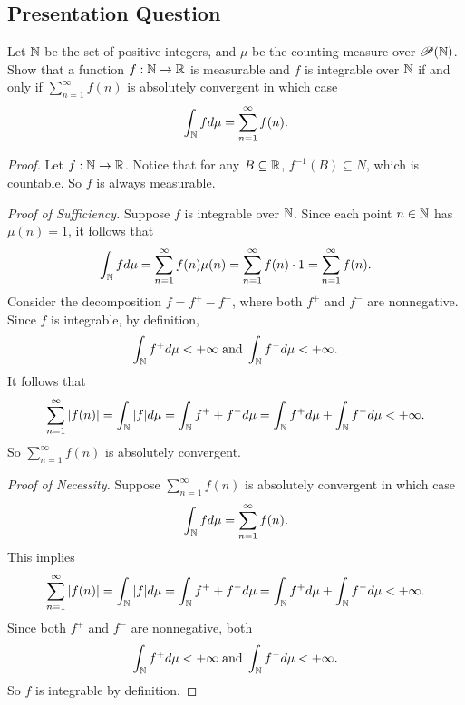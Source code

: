\documentclass[class=book, crop=false]{standalone}
\begin{document}
        \subsection{Presentation Question}
        \begin{question}
            Let $\mathbb{N}$ be the set of positive integers, and $\mu$ be the counting measure over $\mathscr{P}(\mathbb{N})$. Show that a function $f : \mathbb{N} \rightarrow \mathbb{R}$ is measurable and $f$ is integrable over $\mathbb{N}$ if and only if $\sum^{\infty}_{n = 1} f(n)$ is absolutely convergent in which case
            \begin{equation*}
                \int_{\mathbb{N}} f d\mu = \sum^{\infty}_{n = 1} f(n).
            \end{equation*}
        \end{question}
        \begin{proof}
            Let $f : \mathbb{N} \rightarrow \mathbb{R}$. Notice that for any $B \subseteq \mathbb{R}$, $f^{-1}(B) \subseteq N$, which is countable. So $f$ is always measurable.
            
            \noindent \textit{Proof of Sufficiency.} Suppose $f$ is integrable over $\mathbb{N}$. Since each point $n \in \mathbb{N}$ has $\mu(n) = 1$, it follows that
            \begin{equation*}
                \int_{\mathbb{N}} f d\mu = \sum^{\infty}_{n = 1} f(n) \mu(n) = \sum^{\infty}_{n = 1} f(n) \cdot 1 = \sum^{\infty}_{n = 1} f(n).
            \end{equation*}
            Consider the decomposition $f = f^+ - f^-$, where both $f^+$ and $f^-$ are nonnegative. Since $f$ is integrable, by definition,
            \begin{equation*}
                \int_{\mathbb{N}} f^+ d\mu < +\infty \;\text{and}\; \int_{\mathbb{N}} f^- d\mu < +\infty.
            \end{equation*}
            It follows that
            \begin{equation*}
                \sum^{\infty}_{n = 1} |f(n)| = \int_{\mathbb{N}} |f| d\mu = \int_{\mathbb{N}} f^+ + f^- d\mu = \int_{\mathbb{N}} f^+ d\mu + \int_{\mathbb{N}} f^- d\mu < +\infty.
            \end{equation*}
            So $\sum^{\infty}_{n = 1} f(n)$ is absolutely convergent.

            \noindent \textit{Proof of Necessity.} Suppose $\sum^{\infty}_{n = 1} f(n)$ is absolutely convergent in which case
            \begin{equation*}
                \int_{\mathbb{N}} f d\mu = \sum^{\infty}_{n = 1} f(n).
            \end{equation*}
            This implies
            \begin{equation*}
                \sum^{\infty}_{n = 1} |f(n)| = \int_{\mathbb{N}} |f| d\mu = \int_{\mathbb{N}} f^+ + f^- d\mu = \int_{\mathbb{N}} f^+ d\mu + \int_{\mathbb{N}} f^- d\mu < +\infty.
            \end{equation*}
            Since both $f^+$ and $f^-$ are nonnegative, both
            \begin{equation*}
                \int_{\mathbb{N}} f^+ d\mu < +\infty \;\text{and}\; \int_{\mathbb{N}} f^- d\mu < +\infty.
            \end{equation*}
            So $f$ is integrable by definition.
        \end{proof}
\end{document}
